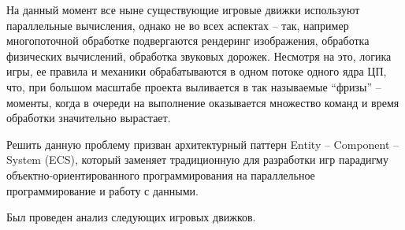 \documentclass[bachelor, och, coursework, times]{SCWorks}
\begin{document}
    На данный момент все ныне существующие игровые движки используют параллельные вычисления, 
    однако не во всех аспектах – так, 
    например многопоточной обработке подвергаются рендеринг изображения, 
    обработка физических вычислений, обработка звуковых дорожек. 
    Несмотря на это, логика игры, ее правила и механики обрабатываются в одном потоке 
    одного ядра ЦП, что, 
    при большом масштабе проекта выливается в так называемые “фризы” – моменты, 
    когда в очереди на выполнение оказывается множество команд и 
    время обработки значительно вырастает.

Решить данную проблему призван архитектурный паттерн 
Entity – Component – System (ECS), 
который заменяет традиционную для разработки игр парадигму 
объектно-ориентированного программирования 
на параллельное программирование и работу с данными.

Был проведен анализ следующих игровых движков.
\end{document}
